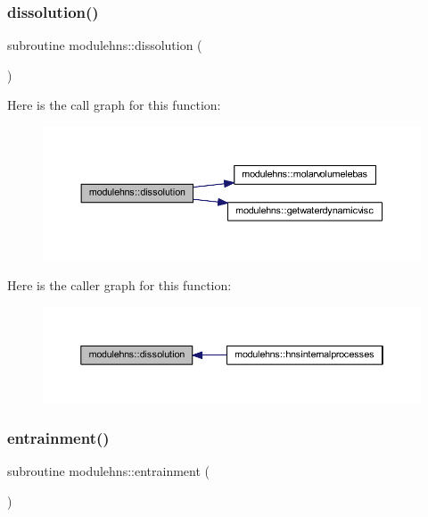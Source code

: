 \subsubsection{\texorpdfstring{dissolution()}{dissolution()}}
{\footnotesize\ttfamily subroutine modulehns\+::dissolution (\begin{DoxyParamCaption}{ }\end{DoxyParamCaption})\hspace{0.3cm}{\ttfamily [private]}}

Here is the call graph for this function\+:\nopagebreak
\begin{figure}[H]
\begin{center}
\leavevmode
\includegraphics[width=350pt]{namespacemodulehns_a2b9b45c82fa5451490cda26d15845a31_cgraph}
\end{center}
\end{figure}
Here is the caller graph for this function\+:\nopagebreak
\begin{figure}[H]
\begin{center}
\leavevmode
\includegraphics[width=350pt]{namespacemodulehns_a2b9b45c82fa5451490cda26d15845a31_icgraph}
\end{center}
\end{figure}
\mbox{\label{namespacemodulehns_a13e99017fa3f908e775b29ff9c3fee14}} 
\subsubsection{\texorpdfstring{entrainment()}{entrainment()}}
{\footnotesize\ttfamily subroutine modulehns\+::entrainment (\begin{DoxyParamCaption}{ }\end{DoxyParamCaption})\hspace{0.3cm}{\ttfamily [private]}}


